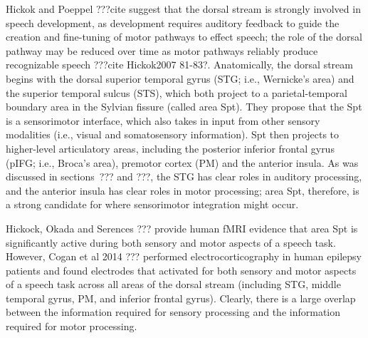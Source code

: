 Hickok and Poeppel ???cite
suggest that the dorsal stream
is strongly involved in
speech development,
as development requires auditory feedback
to guide the creation and fine-tuning
of motor pathways to effect speech;
the role of the dorsal pathway may
be reduced over time as motor pathways
reliably produce recognizable speech
???cite Hickok2007 81-83?.
Anatomically, the dorsal stream begins with
the dorsal superior temporal gyrus (STG; i.e., Wernicke's area)
and the superior temporal sulcus (STS),
which both project to
a parietal-temporal boundary area in the Sylvian fissure
(called area Spt).
They propose that the Spt is a sensorimotor interface,
which also takes in input from other sensory modalities
(i.e., visual and somatosensory information).
Spt then projects to higher-level articulatory areas,
including the posterior inferior frontal gyrus (pIFG; i.e., Broca's area),
premotor cortex (PM) and the anterior insula.
As was discussed in sections~??? and ???,
the STG has clear roles in auditory processing,
and the anterior insula has clear roles in
motor processing;
area Spt, therefore, is a strong candidate
for where sensorimotor integration might occur.

Hickock, Okada and Serences ???
provide human fMRI evidence that
area Spt is significantly active
during both sensory and motor aspects
of a speech task.
However, Cogan et al 2014 ???
performed electrocorticography
in human epilepsy patients
and found electrodes that activated
for both sensory and motor aspects
of a speech task across all areas
of the dorsal stream
(including STG, middle temporal gyrus, PM,
and inferior frontal gyrus).
Clearly, there is a large overlap
between the information required for
sensory processing and the information required
for motor processing.

